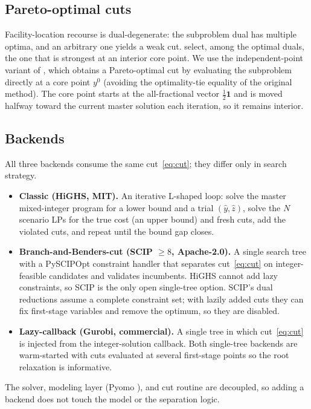 \documentclass[11pt]{article}
\begin{document}
\subsection{Pareto-optimal cuts}
Facility-location recourse is dual-degenerate: the subproblem dual has multiple
optima, and an arbitrary one yields a weak cut. \citet{magnanti1981} select, among
the optimal duals, the one that is strongest at an interior core point. We use the
independent-point variant of \citet{papadakos2008}, which obtains a Pareto-optimal
cut by evaluating the subproblem directly at a core point $y^0$ (avoiding the
optimality-tie equality of the original method). The core point starts at the
all-fractional vector $\tfrac12\mathbf{1}$ and is moved halfway toward the current
master solution each iteration, so it remains interior.

\subsection{Backends}
All three backends consume the same cut~\eqref{eq:cut}; they differ only in search
strategy.
\begin{itemize}
  \item \textbf{Classic (HiGHS, MIT).} An iterative L-shaped loop: solve the master
  mixed-integer program for a lower bound and a trial $(\hat y,\hat z)$, solve the
  $N$ scenario LPs for the true cost (an upper bound) and fresh cuts, add the
  violated cuts, and repeat until the bound gap closes.
  \item \textbf{Branch-and-Benders-cut (SCIP $\ge 8$, Apache-2.0).} A single search
  tree with a PySCIPOpt constraint handler that separates cut~\eqref{eq:cut} on
  integer-feasible candidates and validates incumbents. HiGHS cannot add lazy
  constraints, so SCIP is the only open single-tree option. SCIP's dual reductions
  assume a complete constraint set; with lazily added cuts they can fix first-stage
  variables and remove the optimum, so they are disabled.
  \item \textbf{Lazy-callback (Gurobi, commercial).} A single tree in which
  cut~\eqref{eq:cut} is injected from the integer-solution callback. Both
  single-tree backends are warm-started with cuts evaluated at several first-stage
  points so the root relaxation is informative.
\end{itemize}
The solver, modeling layer (Pyomo \citep{pyomo}), and cut routine are decoupled, so
adding a backend does not touch the model or the separation logic.
\end{document}
